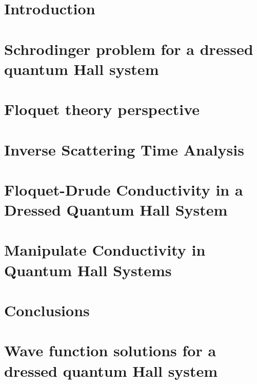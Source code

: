 \documentclass[%
 reprint,
 amsmath,amssymb,
 aps,
prb,
]{revtex4-2}
\begin{document}
\section{\label{sec_introduction} Introduction}


\section{\label{sec_schrodinger_problem} Schrodinger problem for a dressed quantum Hall system}


\section{\label{sec_floquet_theory} Floquet theory perspective}


\section{\label{sec_inverse_scattering_time}  Inverse Scattering Time Analysis}


\section{\label{sec_floquet_drude_conductivity} Floquet-Drude Conductivity in a Dressed Quantum Hall System}


\section{\label{sec_manipulate_conductivity} Manipulate Conductivity in Quantum Hall Systems}


\section{\label{sec_conclusions} Conclusions}


\begin{acknowledgments}

\end{acknowledgments}

\appendix

\section{\label{appendix_a} Wave function solutions for a dressed quantum Hall system}

\end{document}
